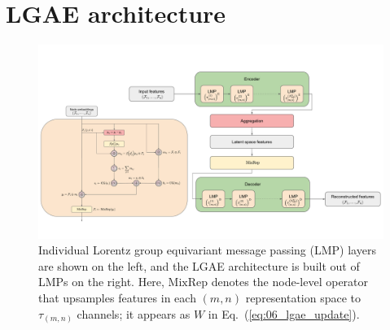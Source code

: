 



\section{LGAE architecture}
\label{sec:06_lgae_architecture}

\begin{figure}[htb!]
    \centering
    \includegraphics[width=\linewidth]{figures/06-ML4Jets/lgae/architectures/LGAE.pdf}
    \caption[Individual Lorentz group equivariant message passing (LMP) layers are shown on the left, and the LGAE architecture is built out of LMPs on the right.]{Individual Lorentz group equivariant message passing (LMP) layers are shown on the left, and the LGAE architecture is built out of LMPs on the right.
    Here, $\mathrm{MixRep}$ denotes the node-level operator that upsamples features in each $(m, n)$ representation space to $\tau_{(m, n)}$ channels; it appears as $W$ in Eq.~(\ref{eq:06_lgae_update}).}
    \label{fig:06_lgae_architecture-full}
\end{figure}


